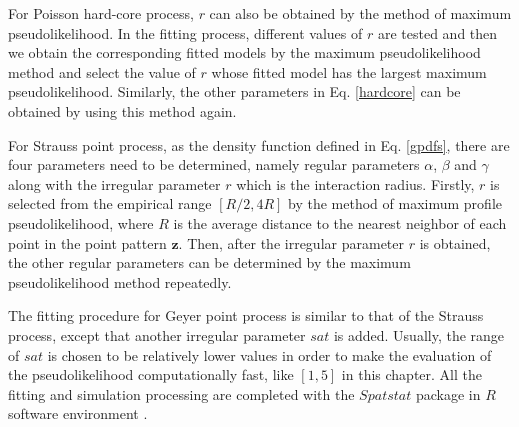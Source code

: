 For Poisson hard-core process, $r$ can also be obtained by the method of maximum pseudolikelihood. In the fitting process, different values of $r$ are tested and then we obtain the corresponding fitted models by the maximum pseudolikelihood method and select the value of $r$ whose fitted model has the largest maximum pseudolikelihood. Similarly, the other parameters in Eq. \eqref{hardcore} can be obtained by using this method again.

For Strauss point process, as the density function defined in Eq. \eqref{gpdfs}, there are four parameters need to be determined, namely regular parameters $\alpha$, $\beta$ and $\gamma$ along with the irregular parameter $r$ which is the interaction radius. Firstly, $r$ is selected from the empirical range $[R/2,4R]$ by the method of maximum profile pseudolikelihood, where $R$ is the average distance to the nearest neighbor of each point in the point pattern $\mathbf{z}$. Then, after the irregular parameter $r$ is obtained, the other regular parameters can be determined by the maximum pseudolikelihood method repeatedly.

The fitting procedure for Geyer point process is similar to that of the Strauss process, except that another irregular parameter $sat$ is added. Usually, the range of $sat$ is chosen to be relatively lower values in order to make the evaluation of the pseudolikelihood computationally fast, like $[1,5]$ in this chapter. All the fitting and simulation processing are completed with the $Spatstat$ package in $R$ software environment \cite{baddeley2005spatstat}.



